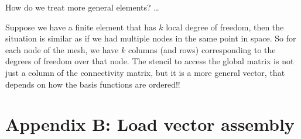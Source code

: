 \documentclass[]{report}
\begin{document}
    How do we treat more general elements? \dots

    Suppose we have a finite element that has $k$ local degree of freedom, then the situation is similar as if we had multiple nodes in the same point in space. So for each node of the mesh, we have $k$ columns (and rows) corresponding to the degrees of freedom over that node. The stencil to access the global matrix is not just a column of the connectivity matrix, but it is a more general vector, that depends on how the basis functions are ordered!!

    \section*{Appendix B: Load vector assembly}
\end{document}
